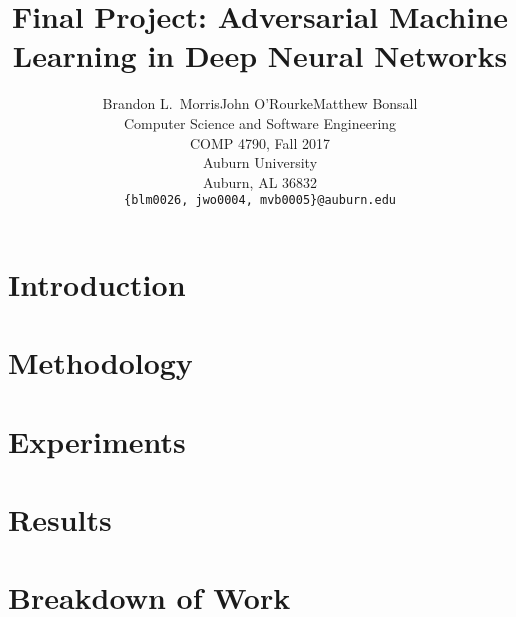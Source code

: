 \documentclass{article}
\title{Final Project: Adversarial Machine Learning in Deep Neural Networks}
\author{Brandon L.~Morris\qquad John O'Rourke\qquad Matthew Bonsall\\
  Computer Science and Software Engineering\\
  COMP 4790, Fall 2017\\
  Auburn University\\
  Auburn, AL 36832\\
  \texttt{\{blm0026, jwo0004, mvb0005\}@auburn.edu}}
\begin{document}
\maketitle


\begin{abstract}
\end{abstract}

\section{Introduction}
\section{Methodology}
\section{Experiments}
\section{Results}
\section{Breakdown of Work}

%


\end{document}
